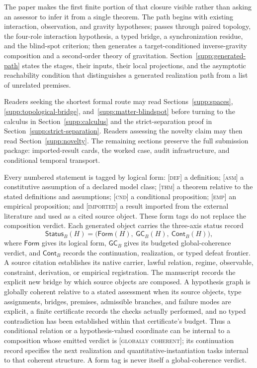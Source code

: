 \documentclass[11pt]{article}
\newcommand{\GCpass}{\textsc{[globally coherent]}}
\newcommand{\Defn}{\textsc{[def]}}
\newcommand{\Asm}{\textsc{[asm]}}
\newcommand{\Thm}{\textsc{[thm]}}
\newcommand{\Cnd}{\textsc{[cnd]}}
\newcommand{\Emp}{\textsc{[emp]}}
\newcommand{\Imp}{\textsc{[imported]}}
\theoremstyle{definition}
\begin{document}
The paper makes the first finite portion of that closure visible rather than asking
an assessor to infer it from a single theorem. The path begins with existing
interaction, observation, and gravity hypotheses; passes through paired topology,
the four-role interaction hypothesis, a typed bridge, a synchronization residue,
and the blind-spot criterion; then generates a target-conditioned inverse-gravity
composition and a second-order theory of gravitation. Section~\ref{supp:generated-path}
states the stages, their inputs, their local projections, and the asymptotic
reachability condition that distinguishes a generated realization path from a list
of unrelated premises.

Readers seeking the shortest formal route may read Sections~\ref{supp:spaces},
\ref{supp:topological-bridge}, and~\ref{supp:matter-blindspot} before turning
to the calculus in Section~\ref{supp:calculus} and the strict-separation proof in
Section~\ref{supp:strict-separation}. Readers assessing the novelty claim may then
read Section~\ref{supp:novelty}. The remaining sections preserve the full
submission package: imported-result cards, the worked case, audit infrastructure,
and conditional temporal transport.

Every numbered statement is tagged by logical form: \Defn{} a definition;
\Asm{} a constitutive assumption of a declared model class; \Thm{} a theorem
relative to the stated definitions and assumptions; \Cnd{} a conditional
proposition; \Emp{} an empirical proposition; and \Imp{} a result imported from
the external literature and used as a cited source object. These form tags do not
replace the composition verdict. Each generated object carries the three-axis status
record
\begin{equation}
\mathsf{Status}_{B}(H)=
\bigl(\mathsf{Form}(H),\ \mathsf{GC}_{B}(H),\ \mathsf{Cont}_{B}(H)\bigr),
\label{eq:three-axis-status}
\end{equation}
where $\mathsf{Form}$ gives its logical form, $\mathsf{GC}_{B}$ gives its
budgeted global-coherence verdict, and $\mathsf{Cont}_{B}$ records the continuation,
realization, or typed defeat frontier. A source citation establishes its native
carrier, lawful relation, regime, observable, constraint, derivation, or empirical
registration. The manuscript records the explicit new bridge by which source
objects are composed. A hypothesis graph is globally coherent relative to a stated
assessment when its source objects, type assignments, bridges, premises, admissible
branches, and failure modes are explicit, a finite certificate records the checks
actually performed, and no typed contradiction has been established within that
certificate's budget. Thus a conditional relation or a hypothesis-valued coordinate
can be internal to a composition whose emitted verdict is \GCpass{}; its continuation
record specifies the next realization and quantitative-instantiation tasks internal
to that coherent structure. A form tag is never itself a global-coherence verdict.
\end{document}
